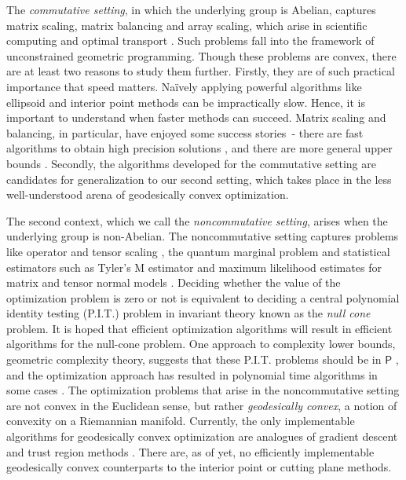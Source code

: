 \documentclass[10pt,a4paper]{article}
\providecommand{\P}{\mathsf{P}}
\numberwithin{equation}{section}
\begin{document}
The \emph{commutative setting}, in which the underlying group is Abelian, captures matrix scaling, matrix balancing and array scaling, which arise in scientific computing and optimal transport \cite{cuturi2013sinkhorn, parlett1971balancing}. Such problems fall into the framework of unconstrained geometric programming. Though these problems are convex, there are at least two reasons to study them further. Firstly, they are of such practical importance that speed matters. Na\"ively applying powerful algorithms like ellipsoid and interior point methods can be impractically slow. Hence, it is important to understand when faster methods can succeed. Matrix scaling and balancing, in particular, have enjoyed some success stories~- there are fast algorithms to obtain high precision solutions \cite{cohen2017matrix,allen2017much}, and there are more general upper bounds \cite{burgisser2020interior}. Secondly, the algorithms developed for the commutative setting are candidates for generalization to our second setting, which takes place in the less well-understood arena of geodesically convex optimization.


The second context, which we call the \emph{noncommutative setting}, arises when the underlying group is non-Abelian. The noncommutative setting captures problems like operator and tensor scaling \cite{garg2016deterministic,burgisser2017alternating},  the quantum marginal problem \cite{burgisser2018efficient} and statistical estimators such as Tyler's M estimator \cite{franks2020rigorous} and maximum likelihood estimates for matrix and tensor normal models \cite{amendola2020invariant}. Deciding whether the value of the optimization problem is zero or not is equivalent to deciding a central polynomial identity testing (P.I.T.) problem in invariant theory known as the \emph{null cone} problem. It is hoped that efficient optimization algorithms will result in efficient algorithms for the null-cone problem.
One approach to complexity lower bounds, geometric complexity theory, suggests that these P.I.T. problems should be in $\P$ \cite{mulmuley2017geometric, garg2019search}, and the optimization approach has resulted in polynomial time algorithms in some cases \cite{garg2016deterministic, allen2018operator}. The optimization problems that arise in the noncommutative setting are not convex in the Euclidean sense, but rather \emph{geodesically convex}, a notion of convexity on a Riemannian manifold. Currently, the only implementable algorithms for geodesically convex optimization are analogues of gradient descent and trust region methods \cite{absil2008optimization, zhang2016first,allen2018operator}. There are, as of yet, no efficiently implementable geodesically convex counterparts to the interior point or cutting plane methods.
\end{document}
